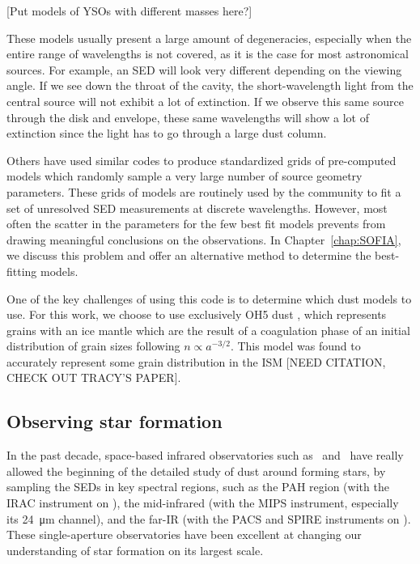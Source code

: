 [Put models of YSOs with different masses here?]

These models usually present a large amount of degeneracies, especially when the entire range of wavelengths is not covered, as it is the case for most astronomical sources. For example, an SED will look very different depending on the viewing angle. If we see down the throat of the cavity, the short-wavelength light from the central source will not exhibit a lot of extinction. If we observe this same source through the disk and envelope, these same wavelengths will show a lot of extinction since the light has to go through a large dust column. %

Others \citep[e.g.,][]{Robitaille:2006cb} have used similar codes to produce standardized grids of pre-computed models which randomly sample a very large number of source geometry parameters. These grids of models are routinely used by the community to fit a set of unresolved SED measurements at discrete wavelengths. However, most often the scatter in the parameters for the few best fit models prevents from drawing meaningful conclusions on the observations. In Chapter~\ref{chap:SOFIA}, we discuss this problem and offer an alternative method to determine the best-fitting models.


One of the key challenges of using this code is to determine which dust models to use. For this work, we choose to use exclusively OH5 dust \citep{Ossenkopf:1994tq}, which represents grains with an ice mantle which are the result of a coagulation phase of an initial distribution of grain sizes following $n\propto a^{-3/2}$. This model was found to accurately represent some grain distribution in the ISM [NEED CITATION, CHECK OUT TRACY'S PAPER].

\subsection{Observing star formation}

In the past decade, space-based infrared observatories such as \Spitzer\ and \Herschel\ have really allowed the beginning of the detailed study of dust around forming stars, by sampling the SEDs in key spectral regions, such as the PAH region (with the IRAC instrument on \Spitzer), the mid-infrared (with the MIPS instrument, especially its \SI{24}{\micro\meter} channel), and the far-IR (with the PACS and SPIRE instruments on \Herschel). These single-aperture observatories have been excellent at changing our understanding of star formation on its largest scale.

